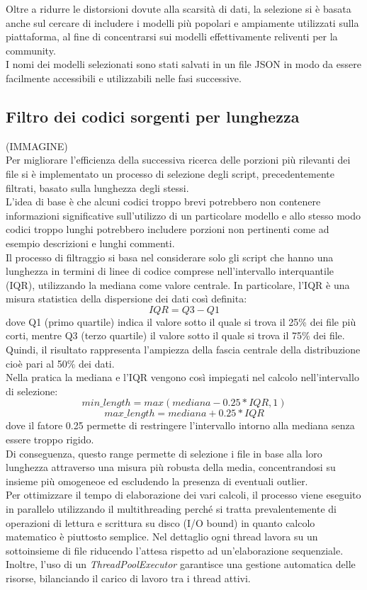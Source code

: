 \documentclass{article}
\begin{document}
Oltre a ridurre le distorsioni dovute alla scarsità di dati, la selezione si è basata anche sul cercare di includere i modelli più popolari e ampiamente utilizzati sulla piattaforma, al fine di concentrarsi sui modelli effettivamente reliventi per la community.\\
I nomi dei modelli selezionati sono stati salvati in un file JSON in modo da essere facilmente accessibili e utilizzabili nelle fasi successive.

\subsection{Filtro dei codici sorgenti per lunghezza}
(IMMAGINE)\\
Per migliorare l'efficienza della successiva ricerca delle porzioni più rilevanti dei file si è implementato un processo di selezione degli script, precedentemente filtrati, basato sulla lunghezza degli stessi.\\
L'idea di base è che alcuni codici troppo brevi potrebbero non contenere informazioni significative sull'utilizzo di un particolare modello e allo stesso modo codici troppo lunghi potrebbero includere porzioni non pertinenti come ad esempio descrizioni e lunghi commenti.\\
Il processo di filtraggio si basa nel considerare solo gli script che hanno una lunghezza in termini di linee di codice comprese nell'intervallo interquantile (IQR), utilizzando la mediana come valore centrale. In particolare, l'IQR è una misura statistica della dispersione dei dati così definita:
\[
IQR = Q3 - Q1
\]
dove Q1 (primo quartile) indica il valore sotto il quale si trova il 25\% dei file più corti, mentre Q3 (terzo quartile) il valore sotto il quale si trova il 75\% dei file. Quindi, il risultato rappresenta l'ampiezza della fascia centrale della distribuzione cioè pari al 50\% dei dati.\\
Nella pratica la mediana e l'IQR vengono così impiegati nel calcolo nell'intervallo di selezione:
\[
min\_length =max(mediana-0.25*IQR,1)
\]
\[
max\_length =mediana+0.25*IQR
\]
dove il fatore 0.25 permette di restringere l'intervallo intorno alla mediana senza essere troppo rigido.\\
Di conseguenza, questo range permette di selezione i file in base alla loro lunghezza attraverso una misura più robusta della media, concentrandosi su insieme più omogeneoe ed escludendo la presenza di eventuali outlier.\\
Per ottimizzare il tempo di elaborazione dei vari calcoli, il processo viene eseguito in parallelo utilizzando il multithreading perché si tratta prevalentemente di operazioni di lettura e scrittura su disco (I/O bound) in quanto calcolo matematico è piuttosto semplice. Nel dettaglio ogni thread lavora su un sottoinsieme di file riducendo l'attesa rispetto ad un'elaborazione sequenziale. Inoltre, l'uso di un \textit{ThreadPoolExecutor}\cite{python-concurrent-futures} garantisce una gestione automatica delle risorse, bilanciando il carico di lavoro tra i thread attivi.\\
\end{document}
